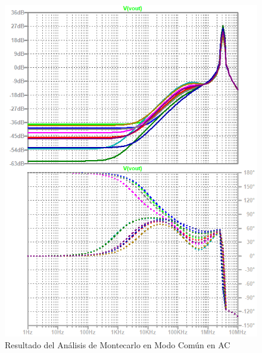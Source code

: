 \begin{figure}[ht]
\begin{center}
\includegraphics[scale=1]{res/spice/spice_cm_ac_bode_mc.png}
\caption{Resultado del Análisis de Montecarlo en Modo Común en AC}
\label{e4:fig_spice_cm_ac_mc}
\end{center}
\end{figure}

